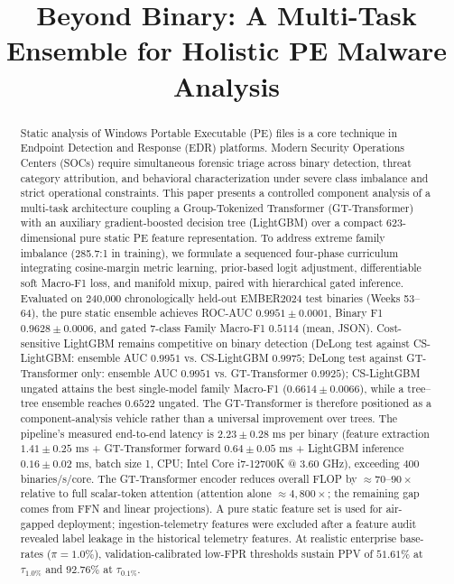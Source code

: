 \documentclass[Number]{sn-jnl}
\begin{document}
\title[Beyond Binary: Multi-Task Ensemble for PE Malware Analysis]{Beyond Binary: A Multi-Task Ensemble for Holistic PE Malware Analysis}

\author[1]{ }
\author[1]{ }
\author[1]{ }

\makeatletter
\g@addto@macro{}
\makeatother


\begin{abstract}
Static analysis of Windows Portable Executable (PE) files is a core technique in Endpoint Detection and Response (EDR) platforms. Modern Security Operations Centers (SOCs) require simultaneous forensic triage across binary detection, threat category attribution, and behavioral characterization under severe class imbalance and strict operational constraints. This paper presents a controlled component analysis of a multi-task architecture coupling a Group-Tokenized Transformer (GT-Transformer) with an auxiliary gradient-boosted decision tree (LightGBM) over a compact 623-dimensional pure static PE feature representation. To address extreme family imbalance (285.7:1 in training), we formulate a sequenced four-phase curriculum integrating cosine-margin metric learning, prior-based logit adjustment, differentiable soft Macro-F1 loss, and manifold mixup, paired with hierarchical gated inference. Evaluated on 240{,}000 chronologically held-out EMBER2024 test binaries (Weeks 53--64), the pure static ensemble achieves ROC-AUC $0.9951\pm0.0001$, Binary F1 $0.9628\pm0.0006$, and gated 7-class Family Macro-F1 $0.5114$ (mean, JSON). Cost-sensitive LightGBM remains competitive on binary detection (DeLong test against CS-LightGBM: ensemble AUC $0.9951$ vs. CS-LightGBM $0.9975$; DeLong test against GT-Transformer only: ensemble AUC $0.9951$ vs. GT-Transformer $0.9925$); CS-LightGBM ungated attains the best single-model family Macro-F1 ($0.6614\pm0.0066$), while a tree--tree ensemble reaches $0.6522$ ungated. The GT-Transformer is therefore positioned as a component-analysis vehicle rather than a universal improvement over trees. The pipeline's measured end-to-end latency is $2.23\pm0.28$ ms per binary (feature extraction $1.41\pm0.25$ ms + GT-Transformer forward $0.64\pm0.05$ ms + LightGBM inference $0.16\pm0.02$ ms, batch size 1, CPU; Intel Core i7-12700K @ 3.60 GHz), exceeding $400$ binaries/s/core. The GT-Transformer encoder reduces overall FLOP by $\approx70$--$90\times$ relative to full scalar-token attention (attention alone $\approx4{,}800\times$; the remaining gap comes from FFN and linear projections). A pure static feature set is used for air-gapped deployment; ingestion-telemetry features were excluded after a feature audit revealed label leakage in the historical telemetry features. At realistic enterprise base-rates ($\pi=1.0\%$), validation-calibrated low-FPR thresholds sustain PPV of $51.61\%$ at $\tau_{1.0\%}$ and $92.76\%$ at $\tau_{0.1\%}$.
\end{abstract}
\end{document}
